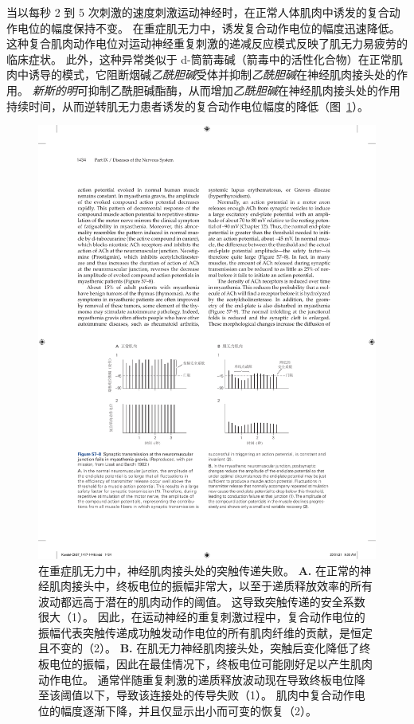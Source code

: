 当以每秒 2 到 5 次刺激的速度刺激运动神经时，在正常人体肌肉中诱发的复合动作电位的幅度保持不变。
在重症肌无力中，诱发复合动作电位的幅度迅速降低。
这种复合肌肉动作电位对运动神经重复刺激的递减反应模式反映了肌无力易疲劳的临床症状。
此外，这种异常类似于 d-筒箭毒碱（箭毒中的活性化合物）在正常肌肉中诱导的模式，它阻断烟碱\textit{乙酰胆碱}受体并抑制\textit{乙酰胆碱}在神经肌肉接头处的作用。
\textit{新斯的明}可抑制乙酰胆碱酯酶，从而增加\textit{乙酰胆碱}在神经肌肉接头处的作用持续时间，从而逆转肌无力患者诱发的复合动作电位幅度的降低（图~\ref{fig:57_8}）。


\begin{figure}[htbp]
	\centering
	\includegraphics[width=1.0\linewidth]{chap57/fig_57_8}
	\caption{在重症肌无力中，神经肌肉接头处的突触传递失败。
		\textbf{A.} 在正常的神经肌肉接头中，终板电位的振幅非常大，以至于递质释放效率的所有波动都远高于潜在的肌肉动作的阈值。
		这导致突触传递的安全系数很大（1）。
		因此，在运动神经的重复刺激过程中，复合动作电位的振幅代表突触传递成功触发动作电位的所有肌肉纤维的贡献，是恒定且不变的（2）。
		\textbf{B.} 在肌无力神经肌肉接头处，突触后变化降低了终板电位的振幅，因此在最佳情况下，终板电位可能刚好足以产生肌肉动作电位。
		通常伴随重复刺激的递质释放波动现在导致终板电位降至该阈值以下，导致该连接处的传导失败（1）。
		肌肉中复合动作电位的幅度逐渐下降，并且仅显示出小而可变的恢复（2）。}
	\label{fig:57_8}
\end{figure}


